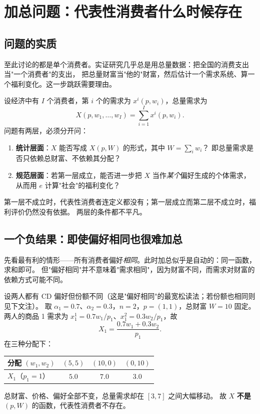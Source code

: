 \section{加总问题：代表性消费者什么时候存在}

\subsection{问题的实质}

至此讨论的都是单个消费者。实证研究几乎总是用总量数据：把全国的消费支出当"一个消费者"的支出，
把总量财富当"他的"财富，然后估计一个需求系统、算一个福利变化。这一步跳跃需要理由。

设经济中有 $I$ 个消费者，第 $i$ 个的需求为 $x^i(p,w_i)$，总量需求为
\[
 X(p,w_1,\ldots,w_I)=\sum_{i=1}^{I}x^i(p,w_i).
\]
问题有两层，必须分开问：
\begin{enumerate}
\item \textbf{统计层面}：$X$ 能否写成 $X(p,W)$ 的形式，其中 $W=\sum_iw_i$？
      即总量需求是否只依赖总财富、不依赖其分配？
\item \textbf{规范层面}：若第一层成立，能否进一步把 $X$ 当作\emph{某个}偏好生成的个体需求，
      从而用 $e$ 计算"社会"的福利变化？
\end{enumerate}
第一层不成立时，代表性消费者连定义都没有；第一层成立而第二层不成立时，福利评价仍然没有依据。
两层的条件都不平凡。

\subsection{一个负结果：即使偏好相同也很难加总}

先看最有利的情形——所有消费者偏好\emph{相同}。此时加总似乎是自动的：同一函数，求和即可。
但"偏好相同"并不意味着"需求相同"，因为财富不同，而需求对财富的依赖方式可能不同。

\begin{example}\label{ex:agg-fail}
设两人都有 CD 偏好但份额不同（这是"偏好相同"的最宽松读法；若份额也相同则见下文注）。
取 $\alpha_1=0.7$、$\alpha_2=0.3$，$n=2$，$p=(1,1)$，总财富 $W=10$ 固定。
两人的商品 1 需求为 $x^1_1=0.7w_1/p_1$、$x^2_1=0.3w_2/p_1$，故
\[
 X_1=\frac{0.7w_1+0.3w_2}{p_1}.
\]
在三种分配下：
\begin{center}
\begin{tabular}{lccc}
\toprule
分配 $(w_1,w_2)$ & $(5,5)$ & $(10,0)$ & $(0,10)$\\
\midrule
$X_1$（$p_1=1$） & $5.0$ & $7.0$ & $3.0$\\
\bottomrule
\end{tabular}
\end{center}
总财富、价格、偏好全部不变，总量需求却在 $[3,7]$ 之间大幅移动。
故 $X$ \textbf{不是} $(p,W)$ 的函数，代表性消费者不存在。
\end{example}


